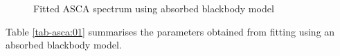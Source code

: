 				\begin{figure}[h!]
					\centering
					\caption{Fitted ASCA spectrum using absorbed blackbody model}
					\label{asca:abs-bb}
				\end{figure}
				
				Table \ref{tab-asca:01} summarises the parameters obtained from fitting using an absorbed blackbody model.


